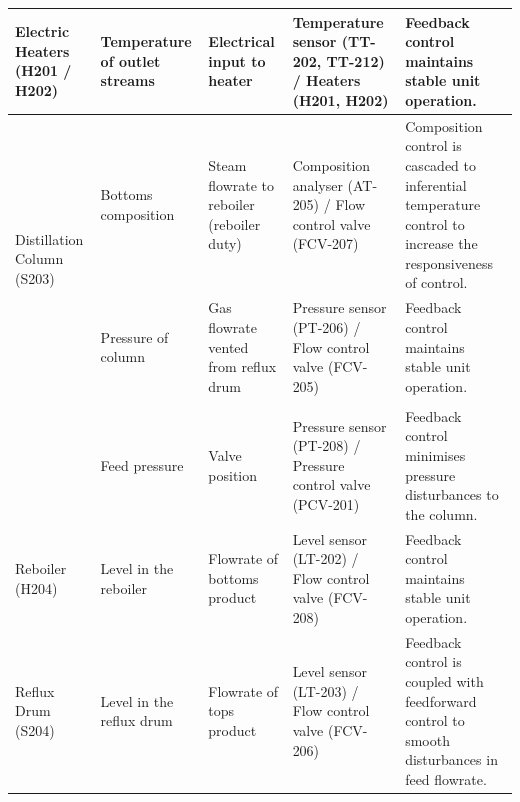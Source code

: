 \begin{table}[h]
{\begin{tabular}{p{3cm}|p{3cm}|p{4cm}|p{5cm}|p{6cm}}
                                                                                        \midrule
Electric Heaters (H201 / H202)              & Temperature of outlet streams               & Electrical input to heater                              & Temperature sensor (TT-202, TT-212) / Heaters (H201, H202)                 & Feedback control maintains stable unit operation.                                                                                    \\ \midrule
\multirow{3}{*}{Distillation Column (S203)} & Bottoms composition                         & Steam flowrate to reboiler (reboiler duty)              & Composition analyser (AT-205) / Flow control valve (FCV-207)               & Composition control is cascaded to inferential temperature control to   increase the responsiveness of control.                      \\
                                            & Pressure of column        & Gas   flowrate vented from reflux drum & Pressure   sensor (PT-206) / Flow control valve (FCV-205) & Feedback   control maintains stable unit operation.                                                                \\
                                            &                                             &                                                         &                                                                            &                                                                                                                                      \\
                                            & Feed   pressure                             & Valve position                                          & Pressure sensor (PT-208) / Pressure control valve (PCV-201)                & Feedback control minimises pressure disturbances to the column.                                                                      \\ \midrule
Reboiler (H204)                             & Level in the reboiler                       & Flowrate of bottoms product                             & Level sensor (LT-202) / Flow control valve (FCV-208)                       & Feedback control maintains stable unit operation.                                                                                    \\ \midrule
Reflux Drum (S204)        & Level in   the reflux drum & Flowrate   of tops product            & Level   sensor (LT-203) / Flow control valve (FCV-206)   & Feedback   control is coupled with feedforward control to smooth disturbances in feed flowrate.                   \\

\end{tabular}}
\end{table}
